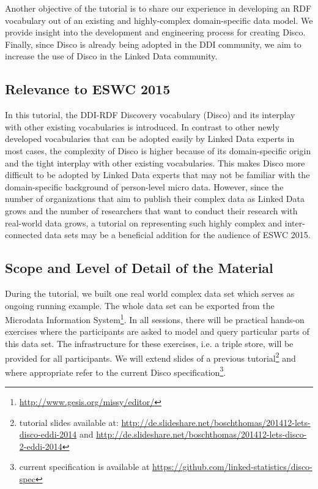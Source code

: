 \documentclass{llncs}
\begin{document}
Another objective of the tutorial is to share our experience in developing an RDF vocabulary out of an existing and highly-complex domain-specific data model. We provide insight into the development and engineering process for creating Disco.
Finally, since Disco is already being adopted in the DDI community, we aim to increase the use of Disco in the Linked Data community.

\subsection{Relevance to ESWC 2015}
In this tutorial, the DDI-RDF Discovery vocabulary (Disco) and its interplay with other existing vocabularies is introduced. In contrast to other newly developed vocabularies that can be adopted easily by Linked Data experts in most cases, the complexity of Disco is higher because of its domain-specific origin and the tight interplay with other existing vocabularies. This makes Disco more difficult to be adopted by Linked Data experts that may not be familiar with the domain-specific background of person-level micro data. However, since the number of organizations that aim to publish their complex data as Linked Data grows and the number of researchers that want to conduct their research with real-world data grows, a tutorial on representing such highly complex and inter-connected data sets may be a beneficial addition for the audience of ESWC 2015.

\subsection{Scope and Level of Detail of the Material}

During the tutorial, we built one real world complex data set which serves as ongoing running example. 
The whole data set can be exported from the Microdata Information System\footnote{\url{http://www.gesis.org/missy/editor/}}. 
In all sessions, there will be practical hands-on exercises where the participants are asked to model and query particular parts of this data set. 
The infrastructure for these exercises, i.e. a triple store, will be provided for all participants.
We will extend slides of a previous tutorial\footnote{tutorial slides available at: \url{http://de.slideshare.net/boschthomas/201412-lets-disco-eddi-2014} and \url{http://de.slideshare.net/boschthomas/201412-lets-disco-2-eddi-2014}} 
and where appropriate refer to the current Disco specification\footnote{current specification is available at \url{https://github.com/linked-statistics/disco-spec}}.
\end{document}
